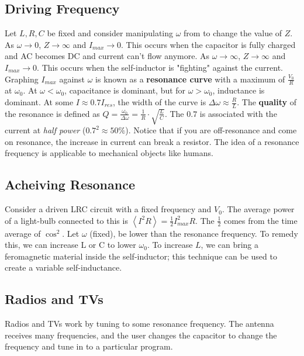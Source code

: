 \documentclass{article}
\newcommand{\expect}[1]{\left\langle #1 \right\rangle}
\begin{document}
\subsection{Driving Frequency}
Let $L,R,C$ be fixed and consider manipulating $\omega$ from to change the value of $Z$.
As $\omega\rightarrow 0$, $Z\rightarrow \infty$ and $I_{max}\rightarrow 0$.
This occurs when the capacitor is fully charged and AC becomes DC and current can't flow anymore.
As $\omega\rightarrow\infty$, $Z\rightarrow\infty$ and $I_{max}\rightarrow 0$. 
This occurs when the self-inductor is "fighting" against the current. Graphing $I_{max}$ against $\omega$
is known as a \textbf{resonance curve} with a maximum of $\frac{V_0}{R}$ at $\omega_{0}$. At $\omega<\omega_0$,
capacitance is dominant, but for $\omega>\omega_0$, inductance is dominant. At some $I\approx 0.7I_{res}$,
the width of the curve is $\Delta \omega\approx\frac{R}{L}$. The \textbf{quality} of the resonance is 
defined as $Q=\frac{\omega_{0}}{\Delta \omega}=\frac{1}{R}\cdot \sqrt{\frac{L}{C}}$. The $0.7$ is associated
with the current at {\it half power} ($0.7^{2}\approx 50\%$). Notice that if you are off-resonance and come on resonance, 
the increase in current can break a resistor. The idea of a resonance frequency is applicable to mechanical objects like humans.

\subsection{Acheiving Resonance}
Consider a driven LRC circuit with a fixed frequency and $V_{0}$. The average power of a light-bulb 
connected to this is $\expect{I^{2}R}=\frac{1}{2}I_{max}^{2}R$. The $\frac{1}{2}$ comes from the time average of $\cos^{2}$.
Let $\omega$ (fixed), be lower than the resonance frequency. To remedy this, we can increase L or C to lower $\omega_{0}$.
To increase $L$, we can bring a feromagnetic material inside the self-inductor; this technique can be used to create a variable
self-inductance.

\subsection{Radios and TVs}
Radios and TVs work by tuning to some resonance frequency. The antenna receives many frequencies, and the user changes the capacitor
to change the frequency and tune in to a particular program.
\end{document}

